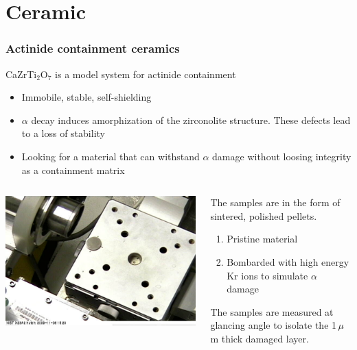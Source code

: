 \documentclass[10pt, xcolor=x11names, compress, handout]{beamer}
\begin{document}
\section{Ceramic}
\begin{frame}
  \frametitle{Actinide containment ceramics}
  
  CaZrTi$_2$O$_7$ is a model system for actinide containment
  \begin{itemize}
  \item Immobile, stable, self-shielding
  \item $\alpha$ decay induces amorphization of the zirconolite
    structure.  These defects lead to a loss of stability
  \item Looking for a material that can withstand $\alpha$ damage
    without loosing integrity as a containment matrix
  \end{itemize}

  \begin{columns}
    \begin{column}{0.4\linewidth}
      \includegraphics[width=\linewidth]{images/tilt_stage.jpg}
    \end{column}
    \begin{column}{0.6\linewidth}
      The samples are in the form of sintered, \alert{polished}
      pellets.
      \begin{enumerate}
      \item Pristine material
      \item Bombarded with high energy Kr ions to simulate $\alpha$
        damage
      \end{enumerate}
      The samples are measured at glancing angle to isolate the
      1\,$\mu$m thick damaged layer.
    \end{column}
  \end{columns}
\end{frame}
\end{document}
